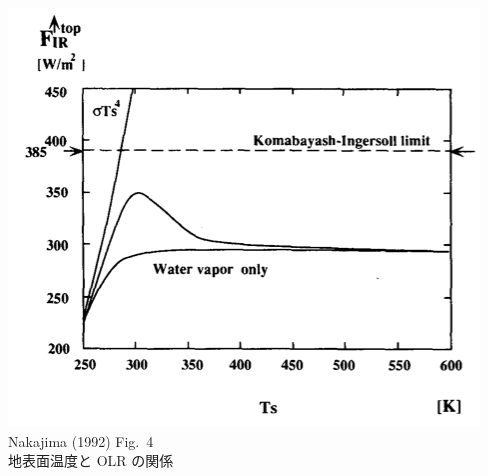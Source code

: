 \documentclass[aspectratio=149,9pt,]{beamer}
\begin{document}
\begin{frame}
\begin{columns}[T,onlytextwidth]
\begin{column}{.4\textwidth}
			\par
			\includegraphics[width=\textwidth]{nf4.png}\\
			Nakajima \etal (1992) Fig.\ 4\\地表面温度と OLR の関係
		\end{column}
	\end{columns}
\end{frame}
\end{document}
